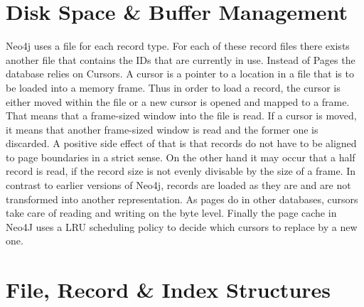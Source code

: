 \documentclass[a4paper,10pt]{article}
\begin{document}
\newpage

\section{Disk Space \& Buffer Management}
    Neo4j uses a file for each record type. For each of these record files there exists another file that contains the IDs that are currently in use. Instead of Pages the database relies on Cursors. A cursor is a pointer to a location in a file that is to be loaded into a memory frame. Thus in order to load a record, the cursor is either moved within the file or a new cursor is opened and mapped to a frame. That means that a frame-sized window into the file is read. If a cursor is moved, it means that another frame-sized window is read and the former one is discarded.
    A positive side effect of that is that records do not have to be aligned to page boundaries in a strict sense. On the other hand it may occur that a half record is read, if the record size is not evenly divisable by the size of a frame.
    In contrast to earlier versions of Neo4j, records are loaded as they are and are not transformed into another representation.
    As pages do in other databases, cursors take care of reading and writing on the byte level. Finally the page cache in Neo4J uses a LRU scheduling policy to decide which cursors to replace by a new one. 
    \newpage
 

\section{File, Record \& Index Structures}\label{structure}
\end{document}
